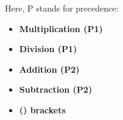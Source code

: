 \setlength{\columnsep}{3pt}
\begin{flushleft}	
	Here, P stands for precedence:
	\begin{itemize}
		\item \textbf{Multiplication (P1)}
		\item \textbf{Division (P1)}
		\item \textbf{Addition (P2)}
		\item \textbf{Subtraction (P2)}
		\item \textbf{() brackets}
	\end{itemize}
	
\end{flushleft}

